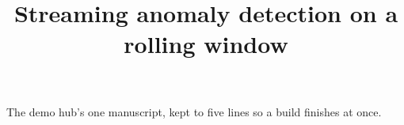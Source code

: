 \documentclass{article}
\title{Streaming anomaly detection on a rolling window}
\begin{document}
\maketitle
The demo hub's one manuscript, kept to five lines so a build finishes at once.
\end{document}
